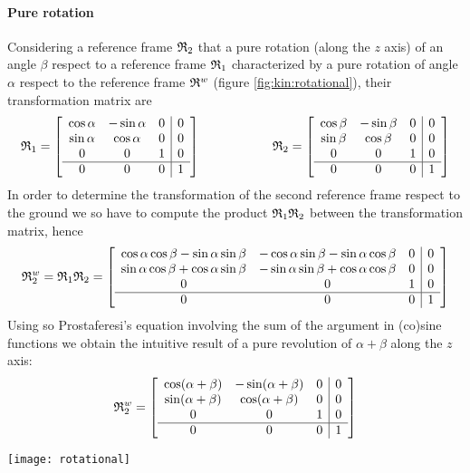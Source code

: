 		\paragraph{Pure rotation} Considering a reference frame $\mathfrak {R}_{2}$ that a pure rotation (along the $z$ axis) of an angle $\beta$ respect to a reference frame $\mathfrak {R}_{1}$ characterized by a pure rotation of angle $\alpha$ respect to the reference frame $\mathfrak{R}^w$ (figure \ref{fig:kin:rotational}), their transformation matrix are
		\[ \mathfrak {R}_{1} = \begin{bmatrix}  \begin{array}{c c c | c} \cos \alpha & -\sin \alpha & 0 & 0 \\ \sin\alpha & \cos \alpha & 0 & 0 \\ 0 & 0 & 1 & 0 \\ \hline 0 & 0 & 0 & 1 \end{array} \end{bmatrix} \hspace{2cm} \mathfrak {R}_{2} = \begin{bmatrix}  \begin{array}{c c c | c} \cos \beta & -\sin \beta & 0 & 0 \\ \sin\beta & \cos \beta & 0 & 0 \\ 0 & 0 & 1 & 0 \\ \hline 0 & 0 & 0 & 1 \end{array} \end{bmatrix} \]
		In order to determine the transformation of the second reference frame respect to the ground we so have to compute the product $\mathfrak {R}_{1} \mathfrak {R}_{2}$ between the transformation matrix, hence
		\[ \mathfrak {R}_{2}^w = \mathfrak {R}_{1} \mathfrak {R}_{2} = \begin{bmatrix}  \begin{array}{c c c | c} \cos \alpha \cos \beta -\sin\alpha\sin\beta & -\cos \alpha \sin \beta -\sin\alpha \cos \beta & 0 & 0 \\ \sin\alpha\cos\beta + \cos\alpha\sin\beta & -\sin\alpha\sin\beta + \cos\alpha\cos\beta & 0 & 0 \\ 0 & 0 & 1 & 0 \\ \hline 0 & 0 & 0 & 1 \end{array} \end{bmatrix} \]
		Using so Prostaferesi's equation involving the sum of the argument in (co)sine functions we obtain the intuitive result of a pure revolution of $\alpha + \beta$ along the $z$ axis:
		\[ \mathfrak {R}_{2}^w = \begin{bmatrix}  \begin{array}{c c c | c} \cos (\alpha +\beta) & -\sin (\alpha + \beta) & 0 & 0 \\ \sin(\alpha + \beta) & \cos (\alpha + \beta) & 0 & 0 \\ 0 & 0 & 1 & 0 \\ \hline 0 & 0 & 0 & 1 \end{array} \end{bmatrix} \]
		\begin{SCfigure}[2][bht]
			\centering \texttt{[image: rotational]}
			\caption{multiple transformations of pure rotation revolving the $z$ axis.} \label{fig:kin:rotational}
		\end{SCfigure}
		
